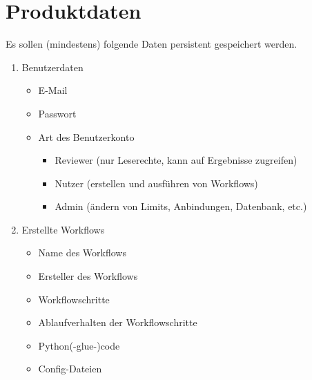 \chapter{Produktdaten}
Es sollen (mindestens) folgende Daten persistent gespeichert werden.

\renewcommand{\labelenumi}{/PD\arabic{enumi}0/}
 \begin{enumerate}
    \item Benutzerdaten
    \begin{itemize}
        \setlength\itemsep{-1em}
        \item E-Mail
        \item Passwort
        \item Art des Benutzerkonto
        \begin{itemize}
            \setlength\itemsep{-1em}
            \item \gls{Reviewer} (nur Leserechte, kann auf Ergebnisse zugreifen)
            \item \gls{Nutzer} (erstellen und ausführen von Workflows)
            \item \gls{Admin} (ändern von Limits, Anbindungen, Datenbank, etc.)
        \end{itemize}
    \end{itemize}
    
    \item Erstellte Workflows
    \begin{itemize}
        \setlength\itemsep{-1em}
        \item Name des \glspl{Workflow}
        \item Ersteller des Workflows
        \item Workflowschritte
        \item Ablaufverhalten der Workflowschritte
        \item Python(-glue-)code
        \item Config-Dateien
    \end{itemize}
    

\end{enumerate}
